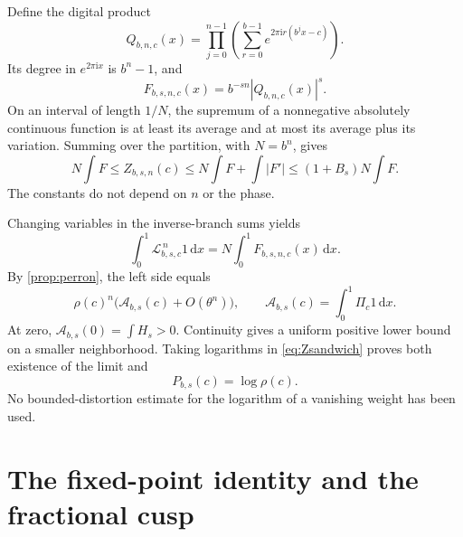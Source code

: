 \documentclass[11pt,a4paper]{article}
\numberwithin{equation}{section}
\theoremstyle{definition}
\theoremstyle{remark}
\newcommand{\ii}{\mathrm i}
\newcommand{\dd}{\,\mathrm d}
\newcommand{\Lop}{\mathcal L}
\newcommand{\Proj}{\Pi}
\begin{document}
Define the digital product
\begin{equation}
 Q_{b,n,c}(x)=\prod_{j=0}^{n-1}
 \left(\sum_{r=0}^{b-1}e^{2\pi\ii r(b^jx-c)}\right).
 \label{eq:digital-product}
\end{equation}
Its degree in $e^{2\pi\ii x}$ is $b^n-1$, and
\begin{equation}
 F_{b,s,n,c}(x)=b^{-sn}|Q_{b,n,c}(x)|^s.
 \label{eq:Qnormal}
\end{equation}
On an interval of length $1/N$, the supremum of a nonnegative absolutely
continuous function is at least its average and at most its average plus
its variation. Summing over the partition, with $N=b^n$, gives
\begin{equation}
 N\int F\le Z_{b,s,n}(c)
 \le N\int F+\int|F'|
 \le(1+B_s)N\int F.
 \label{eq:Zsandwich}
\end{equation}
The constants do not depend on $n$ or the phase.

Changing variables in the inverse-branch sums yields
\begin{equation}
 \int_0^1\Lop_{b,s,c}^{\,n}1\dd x=N\int_0^1F_{b,s,n,c}(x)\dd x.
 \label{eq:int-transfer}
\end{equation}
By \cref{prop:perron}, the left side equals
\[
 \rho(c)^n\bigl(\mathcal A_{b,s}(c)+O(\theta^n)\bigr),\qquad
 \mathcal A_{b,s}(c)=\int_0^1\Proj_c1\dd x.
\]
At zero, $\mathcal A_{b,s}(0)=\int H_s>0$. Continuity gives a uniform
positive lower bound on a smaller neighborhood. Taking logarithms in
\cref{eq:Zsandwich} proves both existence of the limit and
\begin{equation}
 P_{b,s}(c)=\log\rho(c).
 \label{eq:pressure-rho}
\end{equation}
No bounded-distortion estimate for the logarithm of a vanishing weight
has been used.

\section{The fixed-point identity and the fractional cusp}
\label{sec:cusp}
\end{document}
